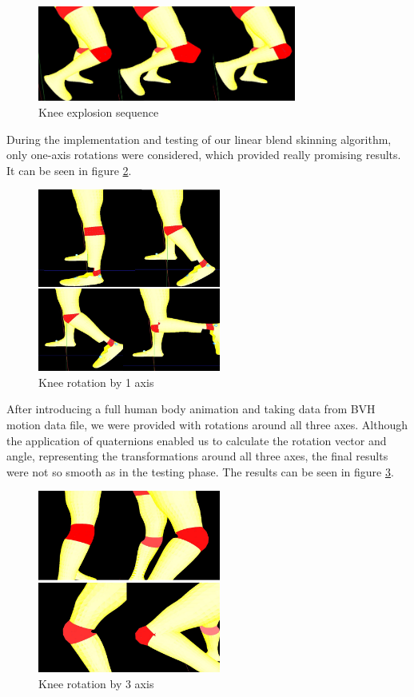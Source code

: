 \documentclass[times, 10pt,twocolumn]{article}
\begin{document}
\begin{figure}[H]
  \caption{Knee explosion sequence}
  \label{knee_explosion}
  \centering
  \includegraphics[width=85mm]{images/s_knee_explosion.jpg}
\end{figure}


During the implementation and testing of our linear blend skinning algorithm, only one-axis rotations were considered, which provided really promising results. It can be seen in figure \ref{knee_1axis}.

\begin{figure}
  \caption{Knee rotation by 1 axis}
  \label{knee_1axis}
  \centering
  \includegraphics[width=60mm]{images/s_knee_rot1.jpg}
\end{figure}

After introducing a full human body animation and taking data from BVH motion data file, we were provided with rotations around all three axes. Although the application of quaternions enabled us to calculate the rotation vector and angle, representing the transformations around all three axes, the final results were not so smooth as in the testing phase. The results can be seen in figure \ref{knee_3axis}.

\begin{figure}[H]
  \caption{Knee rotation by 3 axis}
  \label{knee_3axis}
  \centering
  \includegraphics[width=60mm]{images/s_knee.jpg}
\end{figure}
\end{document}
